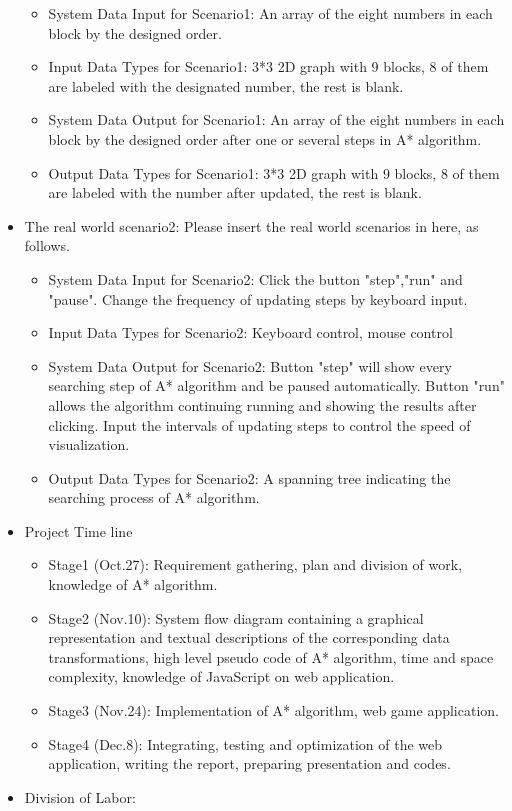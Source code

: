 \begin{itemize}
	\begin{itemize}
	\item{System Data Input for Scenario1: }
	An array of the eight numbers in each block by the designed order.
	\item{Input Data Types for Scenario1: }
	3*3 2D graph with 9 blocks, 8 of them are labeled with the designated number, the rest is blank.
	\item{System Data Output for Scenario1: }
	An array of the eight numbers in each block by the designed order after one or several steps in A* algorithm.
	\item{Output Data Types for Scenario1: }
	3*3 2D graph with 9 blocks, 8 of them are labeled with the number after updated, the rest is blank.
	\end{itemize}

\item{The real world scenario2: }
Please insert the real world scenarios in here, as follows.

	\begin{itemize}
	\item{System Data Input for Scenario2: }
	Click the button "step","run" and "pause". Change the frequency of updating steps by keyboard input.
	\item{Input Data Types for Scenario2: }
	Keyboard control, mouse control
	\item{System Data Output for Scenario2: }
	 Button "step" will show every searching step of A* algorithm and be paused automatically. Button "run" allows the algorithm continuing running and showing the results after clicking.  Input the intervals of updating steps to control the speed of visualization.
	\item{Output Data Types for Scenario2: }
	A spanning tree indicating the searching process of A* algorithm.
	\end{itemize}

\item{Project Time line}
   \begin{itemize}
	\item{Stage1 (Oct.27): }
	Requirement gathering, plan and division of work, knowledge of A* algorithm.
	\item{Stage2 (Nov.10): }
	System flow diagram containing a graphical representation and textual descriptions of the corresponding data transformations, high level pseudo code of A* algorithm, time and space complexity, knowledge of JavaScript on web application.
	\item{Stage3 (Nov.24): }
	Implementation of A* algorithm, web game application.
	\item{Stage4 (Dec.8): }
	Integrating, testing and optimization of the web application, writing the report, preparing presentation and codes.
	\end{itemize}
\item{Division of Labor: }
    \begin{itemize}
    

\end{itemize}
\end{itemize}
